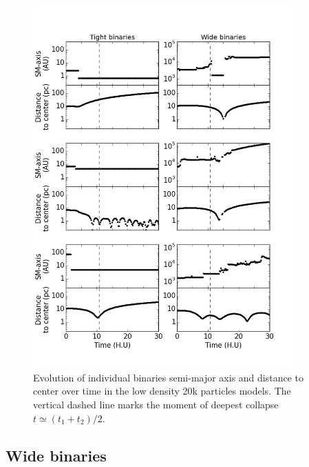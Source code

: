 	
\begin{figure}
\begin{center}
\includegraphics[width=0.9\textwidth]{Figures/6_adventures}
\caption[Evolution of tight and wide binaries separations and distance to center]{ Evolution of individual binaries semi-major axis and distance to center over time in the low density 20k particles models. The vertical dashed line marks the moment of deepest collapse $t \simeq (t_1 + t_2) / 2$. }
\label{Fig:6_adventures}
\end{center}
\end{figure}


\subsection{Wide binaries}



